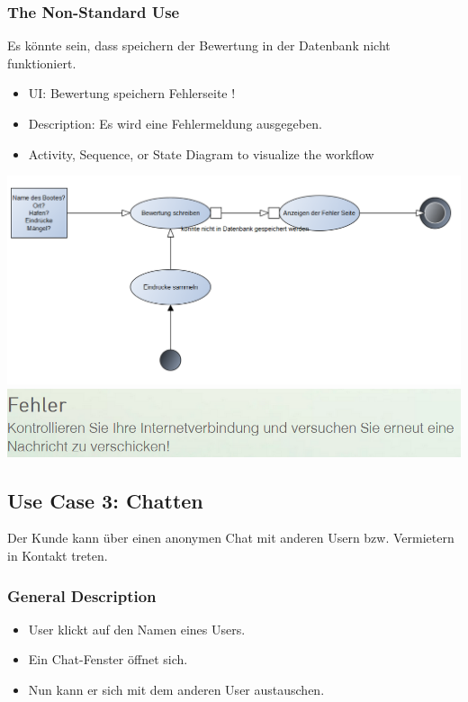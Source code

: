 \documentclass[12pt]{article}
\theoremstyle{definition}
\begin{document}
\subsubsection{The Non-Standard Use}
Es könnte sein, dass speichern der Bewertung in der Datenbank nicht funktioniert.
\begin{itemize}
	\item UI: Bewertung speichern Fehlerseite !
	\item Description: Es wird eine Fehlermeldung ausgegeben.
	\item Activity, Sequence, or State Diagram to visualize the workflow
\end{itemize}
\includegraphics[height=0.40\textwidth]{Bewertung_schreiben_Fehler.PNG}
\includegraphics[height=0.40\textwidth]{Fehler2.PNG}
\pagebreak

\subsection{Use Case 3: Chatten}
Der Kunde kann über einen anonymen Chat mit anderen Usern bzw. Vermietern in Kontakt treten.
\subsubsection{General Description}
	\begin{itemize}
		\item User klickt auf den Namen eines Users.
		\item Ein Chat-Fenster öffnet sich.
		\item Nun kann er sich mit dem anderen User austauschen.
	\end{itemize}
\end{document}
